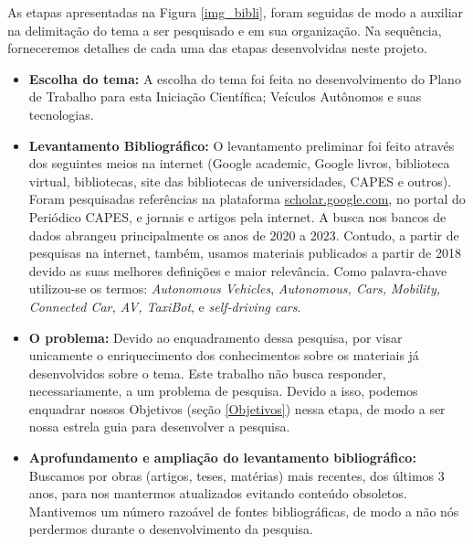 As etapas apresentadas na Figura \ref{img_bibli}, foram seguidas de modo a auxiliar na
delimitação do tema a ser pesquisado e em sua organização. Na sequência, forneceremos detalhes de cada uma das etapas desenvolvidas neste projeto.
\begin{itemize}\label{details}

\item \textbf{Escolha do tema:} A escolha do tema foi feita no desenvolvimento do Plano de Trabalho para esta Iniciação Científica; Veículos Autônomos e suas tecnologias. 

\item \textbf{Levantamento Bibliográfico:} O levantamento preliminar foi feito através dos seguintes meios na internet (Google academic, Google livros, biblioteca virtual, bibliotecas, site das bibliotecas de universidades, CAPES e outros). Foram pesquisadas referências na plataforma \url{scholar.google.com}, no portal do Periódico CAPES, e jornais e artigos pela internet. A busca nos bancos de dados abrangeu principalmente os anos de 2020 a 2023. Contudo, a partir de pesquisas na internet, também, usamos materiais publicados a partir de 2018 devido as suas melhores definições e maior relevância. Como palavra-chave utilizou-se os termos: \textit{Autonomous Vehicles}, \textit{Autonomous, Cars, Mobility, Connected Car, AV, TaxiBot}, e \textit{self-driving cars}.  %


\item \textbf{O problema:} Devido ao enquadramento dessa pesquisa, por visar unicamente o enriquecimento dos conhecimentos sobre os materiais já desenvolvidos sobre o tema. Este trabalho não busca responder, necessariamente, a um problema de pesquisa. Devido a isso, podemos enquadrar nossos Objetivos (seção \ref{Objetivos}) nessa etapa, de modo a ser nossa estrela guia para desenvolver a pesquisa.

\item \textbf{Aprofundamento e ampliação do levantamento bibliográfico:} Buscamos por obras (artigos, teses, matérias) mais recentes, dos últimos 3 anos, para nos mantermos atualizados evitando conteúdo obsoletos. Mantivemos um número razoável de fontes bibliográficas, de modo a não nós perdermos durante o desenvolvimento da pesquisa. 


\end{itemize}
